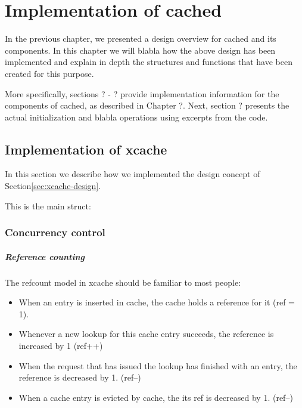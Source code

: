 \chapter{Implementation of cached}\label{ch:cached-implementation}

In the previous chapter, we presented a design overview for cached and its 
components. In this chapter we will blabla how the above design has been
implemented and explain in depth the structures and functions that have been 
created for this purpose.

More specifically, sections ? - ? provide implementation information for the 
components of cached, as described in Chapter ?. Next, section ? presents the 
actual initialization and blabla operations using excerpts from the code.

\section{Implementation of xcache}

In this section we describe how we implemented the design concept of 
Section\ref{sec:xcache-design}.

This is the main struct:


\subsection{Concurrency control}

\paragraph{Reference counting}

The refcount model in xcache should be familiar to most people:

\begin{itemize}
	\item When an entry is inserted in cache, the cache holds a reference 
		for it (ref = 1).
	\item Whenever a new lookup for this cache entry succeeds, the reference 
		is increased by 1 (ref++)
	\item When the request that has issued the lookup has finished with an 
		entry, the reference is decreased by 1. (ref--)
	\item When a cache entry is evicted by cache, the its ref is decreased 
		by 1. (ref--)
\end{itemize}

